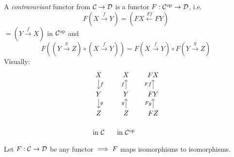 \documentclass[a4paper]{report}
\begin{document}
\begin{defi}
  A \emph{contravariant} functor from $\mathcal{C} \to \mathcal{D}$ is a functor $F: \mathcal{C}^\text{op} \to \mathcal{D}$, i.e. \[F(X \xrightarrow f Y) = (FX \xleftarrow{Ff} FY)\]
  $= (Y \xrightarrow f X)$ in $\mathcal{C}^\text{op}$ and \[F((Y \xrightarrow g Z) \circ (X \xrightarrow f Y)) = F(X \xrightarrow f Y) \circ F(Y \xrightarrow g Z)\]
  Visually:
 \[\begin{tikzcd}[row sep = 14, column sep = 10]
X \arrow[d, "f"] & X                & FX                 \\
Y \arrow[d, "g"] & Y \arrow[u, "f"] & FY \arrow[u, "Ff"] \\
Z                & Z \arrow[u, "g"] & FZ \arrow[u, "Fg"] \\
\text{in } \C    & \text{in } \C\op &
\end{tikzcd}\]
\end{defi}
\begin{rem*}[Exercise]
Let $F: \mathcal{C} \to \mathcal{D}$ be any functor $\implies F$ maps isomorphisms to isomorphisms.
\end{rem*}
\end{document}
